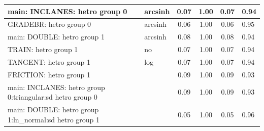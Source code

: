 \begin{table}
\begin{center}
\begin{tabular}{|l|l|c|c|c|l|}
			\hline
			main: INCLANES: hetro group 0 & arcsinh & 0.07 & 1.00 & 0.07 & 0.94 \\
			\hline
			GRADEBR: hetro group 0 & arcsinh & 0.06 & 1.00 & 0.06 & 0.95 \\
			\hline
			main: DOUBLE: hetro group 1 & arcsinh & 0.08 & 1.00 & 0.08 & 0.94 \\
			\hline
			TRAIN: hetro group 1 & no & 0.07 & 1.00 & 0.07 & 0.94 \\
			\hline
			TANGENT: hetro group 1 & log & 0.07 & 1.00 & 0.07 & 0.94 \\
			\hline
			FRICTION: hetro group 1 &  & 0.09 & 1.00 & 0.09 & 0.93 \\
			\hline
			main: INCLANES: hetro group 0:triangular:sd  hetro group 0 &  & 0.09 & 1.00 & 0.09 & 0.93 \\
			\hline
			main: DOUBLE: hetro group 1:ln_normal:sd  hetro group 1 &  & 0.05 & 1.00 & 0.05 & 0.96 \\
			\hline
		\end{tabular}
	\end{center}
\end{table}